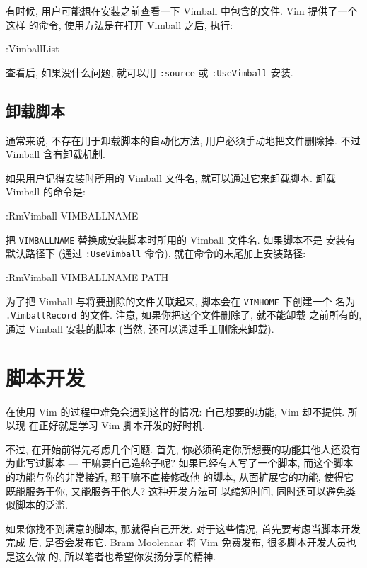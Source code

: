 有时候, 用户可能想在安装之前查看一下 Vimball 中包含的文件. Vim 提供了一个这样
的命令, 使用方法是在打开 Vimball 之后, 执行:
\begin{vimcode}
:VimballList
\end{vimcode}

查看后, 如果没什么问题, 就可以用 \texttt{:source} 或 \texttt{:UseVimball}
安装.

\subsection{卸载脚本}
\label{subsec:uninstalling_scripts}

通常来说, 不存在用于卸载脚本的自动化方法, 用户必须手动地把文件删除掉. 不过
Vimball 含有卸载机制.

如果用户记得安装时所用的 Vimball 文件名, 就可以通过它来卸载脚本. 卸载 Vimball
的命令是:
\begin{vimcode}
:RmVimball VIMBALLNAME
\end{vimcode}
把 \texttt{VIMBALLNAME} 替换成安装脚本时所用的 Vimball 文件名. 如果脚本不是
安装有默认路径下 (通过 \texttt{:UseVimball} 命令), 就在命令的末尾加上安装路径:
\begin{vimcode}
:RmVimball VIMBALLNAME PATH
\end{vimcode}

为了把 Vimball 与将要删除的文件关联起来, 脚本会在 \texttt{VIMHOME} 下创建一个
名为 \texttt{.VimballRecord} 的文件. 注意, 如果你把这个文件删除了, 就不能卸载
之前所有的, 通过 Vimball 安装的脚本 (当然, 还可以通过手工删除来卸载).

\section{脚本开发}
\label{sec:script_development}

在使用 Vim 的过程中难免会遇到这样的情况: 自己想要的功能, Vim 却不提供. 所以现
在正好就是学习 Vim 脚本开发的好时机.

不过, 在开始前得先考虑几个问题.
首先, 你必须确定你所想要的功能其他人还没有为此写过脚本 --- 干嘛要自己造轮子呢?
如果已经有人写了一个脚本, 而这个脚本的功能与你的非常接近, 那干嘛不直接修改他
的脚本, 从面扩展它的功能, 使得它既能服务于你, 又能服务于他人? 这种开发方法可
以缩短时间, 同时还可以避免类似脚本的泛滥.

如果你找不到满意的脚本, 那就得自己开发. 对于这些情况, 首先要考虑当脚本开发完成
后, 是否会发布它. Bram Moolenaar 将 Vim 免费发布, 很多脚本开发人员也是这么做
的, 所以笔者也希望你发扬分享的精神.

